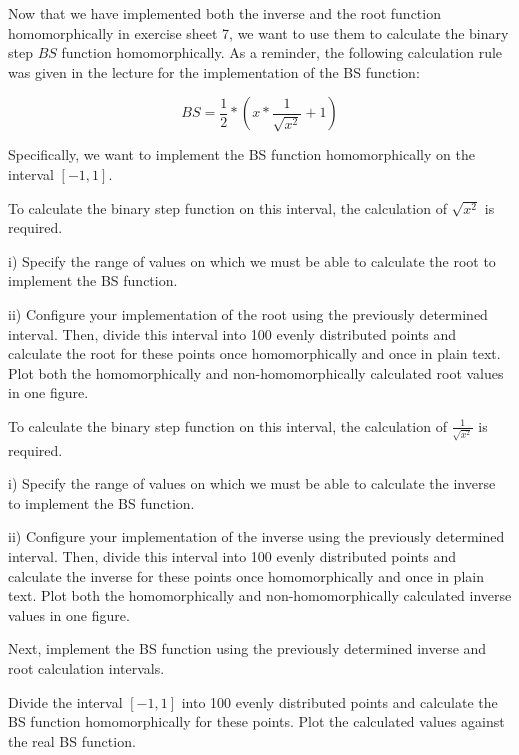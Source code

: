 \begin{aufgabe}
Now that we have implemented both the inverse and the root function homomorphically in exercise sheet 7, we want to use them to calculate the binary step $BS$ function homomorphically. As a reminder, the following calculation rule was given in the lecture for the implementation of the BS function:   


\begin{equation}
    BS = \frac{1}{2} * (x * \frac{1}{\sqrt{x^2}} +1)
\end{equation}

Specifically, we want to implement the BS function homomorphically on the interval $[ -1, 1 ]$.

\begin{teilaufgabe}
    \item To calculate the binary step function on this interval, the calculation of $\sqrt{x^2}$ is required. 
    \begin{teilaufgabe}
        \item[i)] Specify the range of values on which we must be able to calculate the root to implement the BS function.
        \item[ii)] Configure your implementation of the root using the previously determined interval. Then, divide this interval into 100 evenly distributed points and calculate the root for these points once homomorphically and once in plain text. Plot both the homomorphically and non-homomorphically calculated root values in one figure.
    \end{teilaufgabe}
    \item To calculate the binary step function on this interval, the calculation of $\frac{1}{\sqrt{x^2}}$ is required. 
    \begin{teilaufgabe}
        \item[i)] Specify the range of values on which we must be able to calculate the inverse to implement the BS function.
        \item[ii)] Configure your implementation of the inverse using the previously determined interval. Then, divide this interval into 100 evenly distributed points and calculate the inverse for these points once homomorphically and once in plain text. Plot both the homomorphically and non-homomorphically calculated inverse values in one figure.
    \end{teilaufgabe}
    \item Next, implement the BS function using the previously determined inverse and root calculation intervals.
    \item Divide the interval $[-1,1]$ into 100 evenly distributed points and calculate the BS function homomorphically for these points. Plot the calculated values against the real BS function.
\end{teilaufgabe}


\end{aufgabe}





